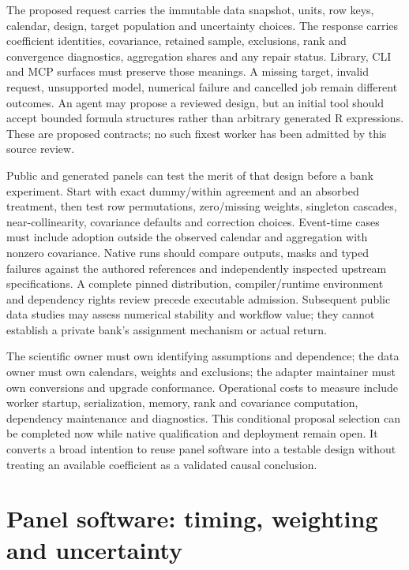 The proposed request carries the immutable data snapshot, units, row keys,
calendar, design, target population and uncertainty choices. The response
carries coefficient identities, covariance, retained sample, exclusions,
rank and convergence diagnostics, aggregation shares and any repair status.
Library, CLI and MCP surfaces must preserve those meanings. A missing target,
invalid request, unsupported model, numerical failure and cancelled job
remain different outcomes. An agent may propose a reviewed design, but an
initial tool should accept bounded formula structures rather than arbitrary
generated R expressions. These are proposed contracts; no such fixest worker
has been admitted by this source review.

Public and generated panels can test the merit of that design before a bank
experiment. Start with exact dummy/within agreement and an absorbed treatment,
then test row permutations, zero/missing weights, singleton cascades,
near-collinearity, covariance defaults and correction choices. Event-time
cases must include adoption outside the observed calendar and aggregation
with nonzero covariance. Native runs should compare outputs, masks and typed
failures against the authored references and independently inspected upstream
specifications. A complete pinned distribution, compiler/runtime environment
and dependency rights review precede executable admission. Subsequent public
data studies may assess numerical stability and workflow value; they cannot
establish a private bank's assignment mechanism or actual return.

The scientific owner must own identifying assumptions and dependence; the
data owner must own calendars, weights and exclusions; the adapter maintainer
must own conversions and upgrade conformance. Operational costs to measure
include worker startup, serialization, memory, rank and covariance computation,
dependency maintenance and diagnostics. This conditional proposal selection
can be completed now while native qualification and deployment remain open.
It converts a broad intention to reuse panel software into a testable design
without treating an available coefficient as a validated causal conclusion.


\section{Panel software: timing, weighting and uncertainty}
\label{exec23:panel-scope}


